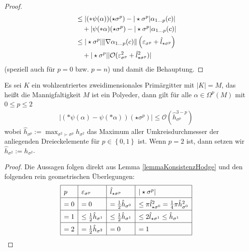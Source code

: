 \begin{proof}
\begin{align}
          &\le \left| (*\psi(\alpha))(\star\sigma^{p}) - |\star\sigma^{p}|\alpha_{1 \ldots p}(c)\right| \\  
          &\quad     +\left|\psi(*\alpha)(\star\sigma^{p}) - |\star\sigma^{p}|\alpha_{1 \ldots p}(c)\right| \\
          &\le |\star\sigma^{p}| \|\nabla\alpha_{1 \ldots p}(c)\| \left(\varepsilon_{\sigma^{p}} + \hat{l}_{\star\sigma^{p}}\right)   \\
          &\quad      + |\star\sigma^{p}||\mathcal{O}(\varepsilon_{\sigma^{p}}^{2} + \hat{l}_{\star\sigma^{p}}^{2})|
    \end{align}
    (speziell auch für \( p=0 \) bzw. \( p=n \)) und damit die Behauptung.
  \end{proof}

  \begin{satz}
    Es sei \( K \) ein wohlzentriertes zweidimensionales Primärgitter mit \( |K| = M \), das heißt die Mannigfaltigkeit \( M \) ist ein Polyeder, dann gilt
    für alle \( \alpha\in\Omega^{p}(M) \) mit \( 0\le p \le 2 \)
    \begin{align}
      \left| \left( *\psi(\alpha) - \psi(*\alpha) \right)(\star\sigma^{p})\right| \le \mathcal{O}\left(\hat{h}_{\sigma^{p}}^{3-p}\right)
    \end{align}
    wobei \(\hat{h}_{\sigma^{p}}:=\max_{\sigma^{2}\succ\sigma^{p}}h_{\sigma^{2}}  \) das Maximum aller Umkreisdurchmesser der anliegenden Dreieckelemente 
    für \( p\in\left\{ 0,1 \right\} \) ist. Wenn \( p=2 \) ist,  dann setzen wir \(\hat{h}_{\sigma^{2}}:= h_{\sigma^{2}}  \).
  \end{satz}
  \begin{proof}
    Die Aussagen folgen direkt aus Lemma \ref{lemmaKonsistenzHodge} und den folgenden rein geometrischen Überlegungen:\\
    \begin{align}
      \label{tabGeometrischeGroessen}
      \renewcommand{\arraystretch}{1.5}
      \begin{array}{|l|l|l|l|} \hline
         p  &  \eps_{\sigma^{p}}                  &  \hat{l}_{\star\sigma^{p}}              &   |\star\sigma^{p}|  \\\hline
         =0  &  = 0                                &  = \frac{1}{2}\hat{h}_{\sigma^{0}}      &  \le \pi \hat{l}_{\star\sigma^{0}}^{2} = \frac{1}{4} \pi \hat{h}_{\sigma^{0}}^{2} \\\hline
         =1  & \le \frac{1}{2}\hat{h}_{\sigma^{1}} & \le \frac{1}{2}\hat{h}_{\sigma^{1}}     & \le 2 \hat{l}_{\star\sigma^{1}} \le \hat{h}_{\sigma^{1}} \\\hline
         =2  & = \frac{1}{2}\hat{h}_{\sigma^{2}}   & = 0                                     & = 1 \\\hline
      \end{array}
    \end{align}
  \end{proof}
